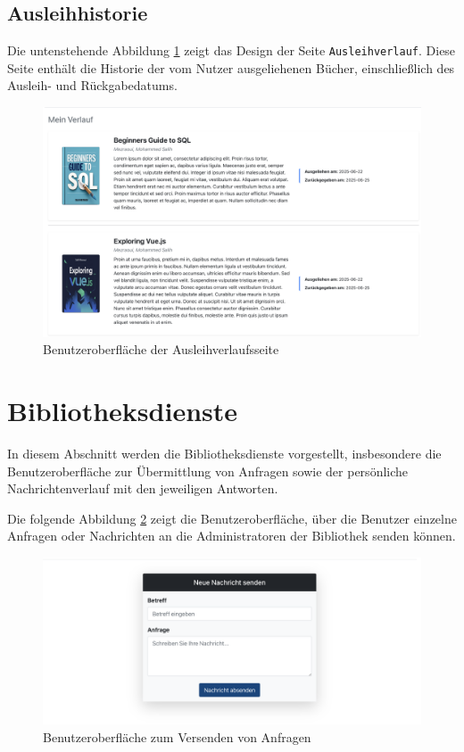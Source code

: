 \subsection{Ausleihhistorie}
Die untenstehende Abbildung \ref{fig:Loans-History-Page} zeigt das Design der Seite \texttt{Ausleihverlauf}. Diese Seite enthält die Historie der vom Nutzer ausgeliehenen Bücher, einschließlich des Ausleih- und Rückgabedatums.

\begin{figure}[H]
	\centering
	\includegraphics[width=1.0\textwidth]{images/UI-screenshots/Loans-History.png}
	\caption{Benutzeroberfläche der Ausleihverlaufsseite}%
	\label{fig:Loans-History-Page}
\end{figure}

\section{Bibliotheksdienste}
In diesem Abschnitt werden die Bibliotheksdienste vorgestellt, insbesondere die Benutzeroberfläche zur Übermittlung von Anfragen sowie der persönliche Nachrichtenverlauf mit den jeweiligen Antworten.

\noindent Die folgende Abbildung \ref{fig:Message-Send} zeigt die Benutzeroberfläche, über die Benutzer einzelne Anfragen oder Nachrichten an die Administratoren der Bibliothek senden können.

\begin{figure}[H]
	\centering
	\includegraphics[width=1.0\textwidth]{images/UI-screenshots/Message-Send.png}
	\caption{Benutzeroberfläche zum Versenden von Anfragen}
	\label{fig:Message-Send}
\end{figure}

